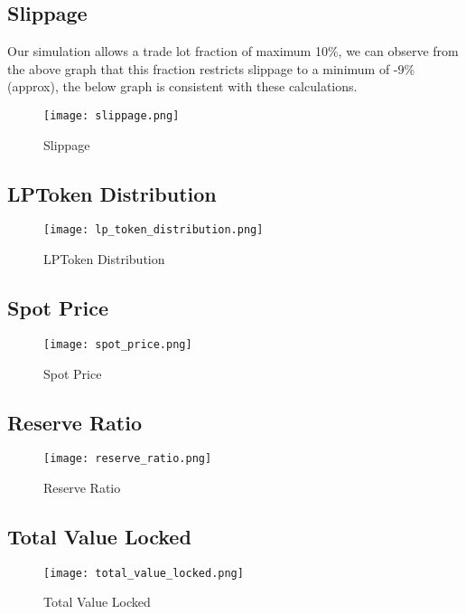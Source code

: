 \documentclass[12pt,a4paper]{article}
\begin{document}
\subsection*{Slippage}
Our simulation allows a trade lot fraction of maximum 10\%, we can observe from the above graph that this fraction restricts slippage to a minimum of -9\% (approx), the below graph is consistent with these calculations.

\begin{figure}[H]
    \centering
    \texttt{[image: slippage.png]}
    \caption{Slippage}
    \label{fig:slippage}
\end{figure}

\subsection*{LPToken Distribution}

\begin{figure}[H]
    \centering
    \texttt{[image: lp\_token\_distribution.png]}
    \caption{LPToken Distribution}
    \label{fig:lp_token_distribution}
\end{figure}

\subsection*{Spot Price}

\begin{figure}[H]
    \centering
    \texttt{[image: spot\_price.png]}
    \caption{Spot Price}
    \label{fig:spot_price}
\end{figure}

\subsection*{Reserve Ratio}

\begin{figure}[H]
    \centering
    \texttt{[image: reserve\_ratio.png]}
    \caption{Reserve Ratio}
    \label{fig:reserve_ratio}
\end{figure}


\subsection*{Total Value Locked}

\begin{figure}[H]
    \centering
    \texttt{[image: total\_value\_locked.png]}
    \caption{Total Value Locked}
    \label{fig:total_value_locked}
\end{figure}
\end{document}
